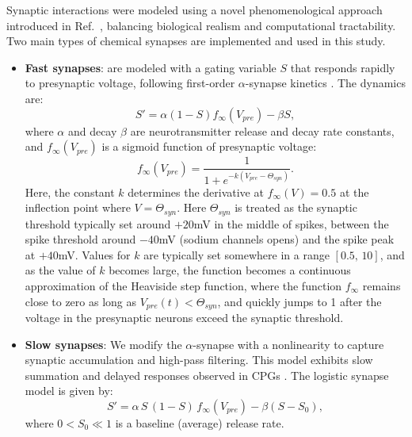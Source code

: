 \documentclass[nofootinbib,aip,amsmath,amssymb,preprint,twocolumn,floatfix,10pt]{revtex4-2}
\begin{document}
Synaptic interactions were modeled using a novel phenomenological approach introduced in  Ref.~\cite{scully2024pairing}, balancing biological realism and computational tractability. Two main types of chemical synapses are implemented and used in this study. 
\begin{itemize}
  \item \textbf{Fast synapses}: are modeled with a gating variable $S$ that responds rapidly to presynaptic voltage, following first-order $\alpha$-synapse kinetics \cite{destexhe1994synthesis, Wang-Rinzel-92, Rall67}. The dynamics are:
  \begin{equation}
    S' = \alpha (1-S) f_{\infty}(V_{pre}) - \beta S,
  \end{equation}
  where  $\alpha$ and decay $\beta$ are neurotransmitter release and decay rate constants, and $f_{\infty}(V_{pre})$ is a sigmoid function of presynaptic voltage:
\begin{equation}
f_{\infty}(V_{pre}) = \frac{1}{1+e^{-k(V_{pre}-\Theta_{syn})}}.  \label{finf}
\end{equation}
Here, the constant $k$ determines the derivative at $f_{\infty}(V) = 0.5$ at the inflection point where $V=\Theta_{syn}$. Here $\Theta_{syn}$ is treated as the synaptic threshold typically set around $+20$mV in the middle of spikes, between the spike threshold around $-40$mV (sodium channels opens) and the spike peak at $+40$mV. Values for $k$ are typically set somewhere in a range $\left[0.5,\, 10\right]$, and as the value of $k$ becomes large,  the function becomes a continuous approximation of the Heaviside step function, where the function $f_\infty$ remains close to zero as long as $V_{pre}(t) < \Theta_{syn}$, and quickly jumps to 1 after the voltage in the presynaptic neurons exceed the synaptic threshold.
  
  \item \textbf{Slow synapses}: We modify the $\alpha$-synapse with a nonlinearity to capture synaptic accumulation and high-pass filtering. This model exhibits slow summation and delayed responses observed in CPGs \cite{NW02, WNT02, TW05, SNLK11}. The logistic synapse model is given by:
  \begin{equation}
    S' = \alpha\, S\,(1-S)\, f_{\infty}(V_{pre}) - \beta (S-S_0),
  \end{equation}
  where $0<S_0 \ll 1$ is a baseline (average) release rate.
\end{itemize}
\end{document}
